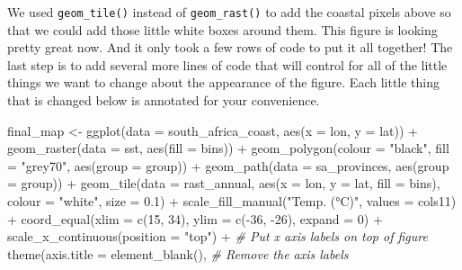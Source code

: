 \documentclass[
]{book}
\newenvironment{Shaded}{\begin{snugshade}}{\end{snugshade}}
\newcommand{\AttributeTok}[1]{\textcolor[rgb]{0.77,0.63,0.00}{#1}}
\newcommand{\CommentTok}[1]{\textcolor[rgb]{0.56,0.35,0.01}{\textit{#1}}}
\newcommand{\DecValTok}[1]{\textcolor[rgb]{0.00,0.00,0.81}{#1}}
\newcommand{\FloatTok}[1]{\textcolor[rgb]{0.00,0.00,0.81}{#1}}
\newcommand{\FunctionTok}[1]{\textcolor[rgb]{0.00,0.00,0.00}{#1}}
\newcommand{\NormalTok}[1]{#1}
\newcommand{\OtherTok}[1]{\textcolor[rgb]{0.56,0.35,0.01}{#1}}
\newcommand{\SpecialCharTok}[1]{\textcolor[rgb]{0.00,0.00,0.00}{#1}}
\newcommand{\StringTok}[1]{\textcolor[rgb]{0.31,0.60,0.02}{#1}}
\begin{document}
We used \texttt{geom\_tile()} instead of \texttt{geom\_rast()} to add the coastal pixels above so that we could add those little white boxes around them. This figure is looking pretty great now. And it only took a few rows of code to put it all together! The last step is to add several more lines of code that will control for all of the little things we want to change about the appearance of the figure. Each little thing that is changed below is annotated for your convenience.

\begin{Shaded}
\begin{Highlighting}[]
\NormalTok{final\_map }\OtherTok{\textless{}{-}} \FunctionTok{ggplot}\NormalTok{(}\AttributeTok{data =}\NormalTok{ south\_africa\_coast, }\FunctionTok{aes}\NormalTok{(}\AttributeTok{x =}\NormalTok{ lon, }\AttributeTok{y =}\NormalTok{ lat)) }\SpecialCharTok{+}
  \FunctionTok{geom\_raster}\NormalTok{(}\AttributeTok{data =}\NormalTok{ sst, }\FunctionTok{aes}\NormalTok{(}\AttributeTok{fill =}\NormalTok{ bins)) }\SpecialCharTok{+}
  \FunctionTok{geom\_polygon}\NormalTok{(}\AttributeTok{colour =} \StringTok{"black"}\NormalTok{, }\AttributeTok{fill =} \StringTok{"grey70"}\NormalTok{, }\FunctionTok{aes}\NormalTok{(}\AttributeTok{group =}\NormalTok{ group)) }\SpecialCharTok{+}
  \FunctionTok{geom\_path}\NormalTok{(}\AttributeTok{data =}\NormalTok{ sa\_provinces, }\FunctionTok{aes}\NormalTok{(}\AttributeTok{group =}\NormalTok{ group)) }\SpecialCharTok{+}
  \FunctionTok{geom\_tile}\NormalTok{(}\AttributeTok{data =}\NormalTok{ rast\_annual, }\FunctionTok{aes}\NormalTok{(}\AttributeTok{x =}\NormalTok{ lon, }\AttributeTok{y =}\NormalTok{ lat, }\AttributeTok{fill =}\NormalTok{ bins), }
            \AttributeTok{colour =} \StringTok{"white"}\NormalTok{, }\AttributeTok{size =} \FloatTok{0.1}\NormalTok{) }\SpecialCharTok{+}
  \FunctionTok{scale\_fill\_manual}\NormalTok{(}\StringTok{"Temp. (°C)"}\NormalTok{, }\AttributeTok{values =}\NormalTok{ cols11) }\SpecialCharTok{+}
  \FunctionTok{coord\_equal}\NormalTok{(}\AttributeTok{xlim =} \FunctionTok{c}\NormalTok{(}\DecValTok{15}\NormalTok{, }\DecValTok{34}\NormalTok{), }\AttributeTok{ylim =} \FunctionTok{c}\NormalTok{(}\SpecialCharTok{{-}}\DecValTok{36}\NormalTok{, }\SpecialCharTok{{-}}\DecValTok{26}\NormalTok{), }\AttributeTok{expand =} \DecValTok{0}\NormalTok{) }\SpecialCharTok{+}
  \FunctionTok{scale\_x\_continuous}\NormalTok{(}\AttributeTok{position =} \StringTok{"top"}\NormalTok{) }\SpecialCharTok{+} \CommentTok{\# Put x axis labels on top of figure}
  \FunctionTok{theme}\NormalTok{(}\AttributeTok{axis.title =} \FunctionTok{element\_blank}\NormalTok{(), }\CommentTok{\# Remove the axis labels}

\end{Highlighting}
\end{Shaded}
\end{document}
